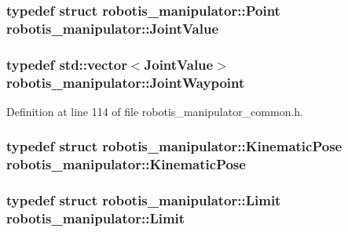 \subsubsection[{\texorpdfstring{Joint\+Value}{JointValue}}]{\setlength{\rightskip}{0pt plus 5cm}typedef struct {\bf robotis\+\_\+manipulator\+::\+Point}  {\bf robotis\+\_\+manipulator\+::\+Joint\+Value}}\hypertarget{namespacerobotis__manipulator_aa0556c98c5294ccf3a96c2d0fe315e40}{}\label{namespacerobotis__manipulator_aa0556c98c5294ccf3a96c2d0fe315e40}
\subsubsection[{\texorpdfstring{Joint\+Waypoint}{JointWaypoint}}]{\setlength{\rightskip}{0pt plus 5cm}typedef std\+::vector$<${\bf Joint\+Value}$>$ {\bf robotis\+\_\+manipulator\+::\+Joint\+Waypoint}}\hypertarget{namespacerobotis__manipulator_a4456fd8b14e1f6b7733a77837dfe9339}{}\label{namespacerobotis__manipulator_a4456fd8b14e1f6b7733a77837dfe9339}


Definition at line 114 of file robotis\+\_\+manipulator\+\_\+common.\+h.

\subsubsection[{\texorpdfstring{Kinematic\+Pose}{KinematicPose}}]{\setlength{\rightskip}{0pt plus 5cm}typedef struct {\bf robotis\+\_\+manipulator\+::\+Kinematic\+Pose}  {\bf robotis\+\_\+manipulator\+::\+Kinematic\+Pose}}\hypertarget{namespacerobotis__manipulator_ab1b7bd11d743d22bca6b64b3026d3ff0}{}\label{namespacerobotis__manipulator_ab1b7bd11d743d22bca6b64b3026d3ff0}
\subsubsection[{\texorpdfstring{Limit}{Limit}}]{\setlength{\rightskip}{0pt plus 5cm}typedef struct {\bf robotis\+\_\+manipulator\+::\+Limit}  {\bf robotis\+\_\+manipulator\+::\+Limit}}\hypertarget{namespacerobotis__manipulator_a1b399f654798ff0e3afb533d344d1485}{}\label{namespacerobotis__manipulator_a1b399f654798ff0e3afb533d344d1485}
